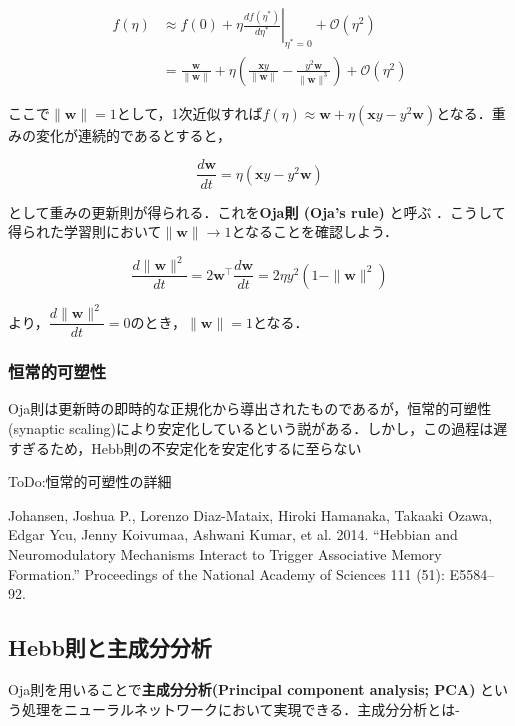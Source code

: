 \begin{align}
f(\eta)&\approx f(0) + \eta \left.\frac{df(\eta^*)}{d\eta^*}\right|_{\eta^*=0} + \mathcal{O}(\eta^2)\\
&=\frac{\mathbf{w}}{\|\mathbf{w}\|} + \eta \left(\frac{\mathbf{x}y}{\|\mathbf{w}\|}-\frac{y^2\mathbf{w}}{\|\mathbf{w}\|^3}\right)+ \mathcal{O}(\eta^2)
\end{align}


ここで$\|\mathbf{w}\|=1$として，1次近似すれば$f(\eta)\approx \mathbf{w} + \eta \left(\mathbf{x}y-y^2 \mathbf{w}\right)$となる．重みの変化が連続的であるとすると，


\begin{equation}
\frac{d\mathbf{w}}{dt} = \eta \left(\mathbf{x}y-y^2 \mathbf{w}\right)
\end{equation}


として重みの更新則が得られる．これを\textbf{Oja則 (Oja's rule)} と呼ぶ \cite{Oja1982-yd}．こうして得られた学習則において$\|\mathbf{w}\|\to 1$となることを確認しよう．


\begin{equation}
\frac{d\|\mathbf{w}\|^2}{dt}=2\mathbf{w}^\top\frac{d\mathbf{w}}{dt}= 2\eta y^2\left(1-\|\mathbf{w}\|^2\right)
\end{equation}


より，$\dfrac{d\|\mathbf{w}\|^2}{dt}=0$のとき，$\|\mathbf{w}\|= 1$となる．
\subsubsection{恒常的可塑性}
Oja則は更新時の即時的な正規化から導出されたものであるが，恒常的可塑性 (synaptic scaling)により安定化しているという説がある\cite{Turrigiano2008-lm}\cite{Yee2017-fb}．しかし，この過程は遅すぎるため，Hebb則の不安定化を安定化するに至らない\cite{Zenke2017-el}

ToDo:恒常的可塑性の詳細

Johansen, Joshua P., Lorenzo Diaz-Mataix, Hiroki Hamanaka, Takaaki Ozawa, Edgar Ycu, Jenny Koivumaa, Ashwani Kumar, et al. 2014. “Hebbian and Neuromodulatory Mechanisms Interact to Trigger Associative Memory Formation.” Proceedings of the National Academy of Sciences 111 (51): E5584–92.
\subsection{Hebb則と主成分分析}
Oja則を用いることで\textbf{主成分分析(Principal component analysis; PCA)} という処理をニューラルネットワークにおいて実現できる．主成分分析とは-

